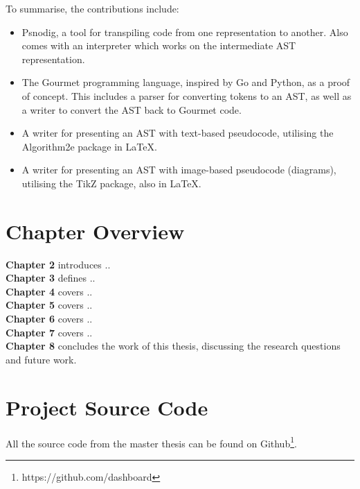 To summarise, the contributions include:
\begin{itemize}
    \item Psnodig, a tool for transpiling code from one representation to another. Also comes with an interpreter which works on the intermediate AST representation.
    \item The Gourmet programming language, inspired by Go and Python, as a proof of concept. This includes a parser for converting tokens to an AST, as well as a writer to convert the AST back to Gourmet code.
    \item A writer for presenting an AST with text-based pseudocode, utilising the Algorithm2e package in \LaTeX.
    \item A writer for presenting an AST with image-based pseudocode (diagrams), utilising the TikZ package, also in \LaTeX.
\end{itemize}

\section{Chapter Overview}

\textbf{Chapter 2} introduces .. \hfill \\

\textbf{Chapter 3} defines .. \hfill \\

\textbf{Chapter 4} covers .. \hfill \\

\textbf{Chapter 5} covers .. \hfill \\

\textbf{Chapter 6} covers .. \hfill \\

\textbf{Chapter 7} covers .. \hfill \\

\textbf{Chapter 8} concludes the work of this thesis, discussing the research questions and future work.

\section{Project Source Code}

All the source code from the master thesis can be found on Github\footnote{https://github.com/dashboard}.
